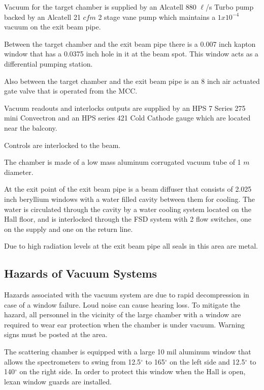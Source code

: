 {Vacuum for the target chamber is supplied by an Alcatell 880
$\ell$/s Turbo pump backed by an Alcatell 21 $cfm$ 2 stage vane pump
which maintains a $1x10^{-4}$ vacuum on the exit beam pipe.

Between the target chamber and the exit beam pipe there is a 0.007 inch
kapton window that has a 0.0375 inch hole in it at the beam spot.  This
window acts as a differential pumping station.

Also between the target chamber and the exit beam pipe is an 8 inch
air actuated gate valve that is operated from the MCC.

Vacuum readouts and interlocks outputs are supplied by an HPS 7 Series 
275 mini Convectron and an HPS series 421 Cold Cathode gauge
which are located near the balcony.

Controls are interlocked to the beam.

The chamber is made of a low mass aluminum corrugated vacuum tube of 1 
$m$ diameter.

At the exit point of the exit beam pipe is a beam diffuser that
consists of 2.025 inch beryllium windows with a water filled cavity between
them for cooling.  The water is circulated through the cavity by a
water cooling system located on the Hall floor, and is interlocked
through the FSD system with 2 flow switches, one on the supply and
one on the return line.

Due to high radiation levels at the exit beam pipe all seals in
this area are metal.
} %

\begin{safetyen}{10}{15}
\section{Hazards of Vacuum Systems}
\end{safetyen}

Hazards associated with the vacuum system are due to rapid 
decompression in case of a window failure. Loud noise can cause hearing
loss.  To mitigate the hazard, all personnel in the vicinity of the 
large chamber with a window are required to wear ear protection when
the chamber is under vacuum. Warning signs must be posted at the area.

The scattering chamber is equipped with a large 10 mil aluminum window that 
allows the spectrometers to swing from 12.5$^{\circ}$ to 165$^{\circ}$ 
on the left side and 12.5$^{\circ}$ to 140$^{\circ}$ on the right side. 
In order to
protect this window when the Hall is open, lexan window guards are
installed.

